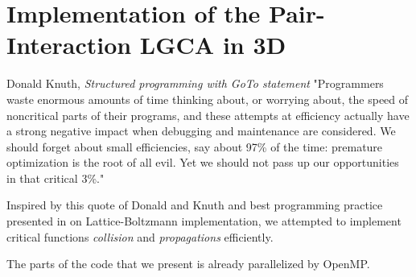 \chapter{Implementation of the Pair-Interaction LGCA in 3D}


\begin{chapquote}{Donald Knuth, \textit{Structured programming with GoTo statement}}
"Programmers waste enormous amounts of time thinking about, or worrying about, the speed of noncritical parts of their programs, and these attempts at efficiency actually have a strong negative impact when debugging and maintenance are considered. We should forget about small efficiencies, say about 97\% of the time: premature optimization is the root of all evil. Yet we should not pass up our opportunities in that critical 3\%."
\end{chapquote}
%


Inspired by this quote of Donald and Knuth and best programming practice presented in \cite{lbm} on Lattice-Boltzmann implementation, we attempted to implement critical functions \textit{collision} and \textit{propagations} efficiently.

The parts of the code that we present is already parallelized by OpenMP.

